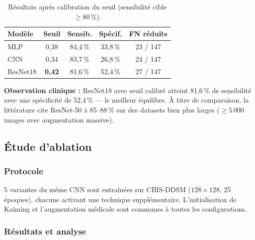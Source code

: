 \documentclass[a4paper,11pt]{article}
\begin{document}
\begin{table}[H]
\centering
\caption{Résultats après calibration du seuil (sensibilité cible $\geq 80\,\%$).}
\begin{tabular}{lcccc}
\toprule
\textbf{Modèle} & \textbf{Seuil} & \textbf{Sensib.} & \textbf{Spécif.} & \textbf{FN réduits} \\
\midrule
MLP   & 0{,}38 & 84{,}4\,\% & 33{,}8\,\% & 23 / 147 \\
CNN   & 0{,}34 & 83{,}7\,\% & 26{,}8\,\% & 24 / 147 \\
ResNet18 & \textbf{0{,}42} & 81{,}6\,\% & 52{,}4\,\% & 27 / 147 \\
\bottomrule
\end{tabular}
\label{tab:ddsm_cal}
\end{table}

\textbf{Observation clinique :} ResNet18 avec seuil calibré atteint 81{,}6\,\% de sensibilité
avec une spécificité de 52{,}4\,\% — le meilleur équilibre.
À titre de comparaison, la littérature cite ResNet-50 à 85--88\,\% sur des datasets
bien plus larges ($\geq 5\,000$ images avec augmentation massive).

\subsection{Étude d'ablation}
\label{sec:ablation}

\subsubsection*{Protocole}

5 variantes du même CNN sont entraînées sur CBIS-DDSM ($128\times128$, 25 époques),
chacune activant une technique supplémentaire. L'initialisation de Kaiming et l'augmentation
médicale sont communes à toutes les configurations.

\subsubsection*{Résultats et analyse}
\end{document}
